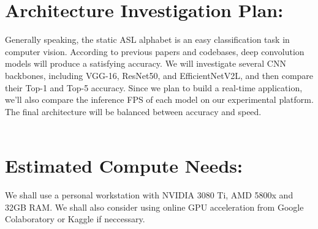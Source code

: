 \documentclass{article}
\begin{document}
\section{Architecture Investigation Plan:} Generally speaking, the static ASL alphabet is an easy classification task in computer vision.
According to previous papers and codebases, deep convolution models will produce a satisfying accuracy.
We will investigate several CNN backbones, including VGG-16, ResNet50, and EfficientNetV2L, and then compare their Top-1 and Top-5 accuracy. Since we plan to build a real-time application, we'll also compare the inference FPS of each model on our experimental platform.
The final architecture will be balanced between accuracy and speed.\\ \\

\section{Estimated Compute Needs:} We shall use a personal workstation 
with NVIDIA 3080 Ti, AMD 5800x and 32GB RAM. We shall also consider using online GPU acceleration from Google Colaboratory or Kaggle if neccessary.
\end{document}
